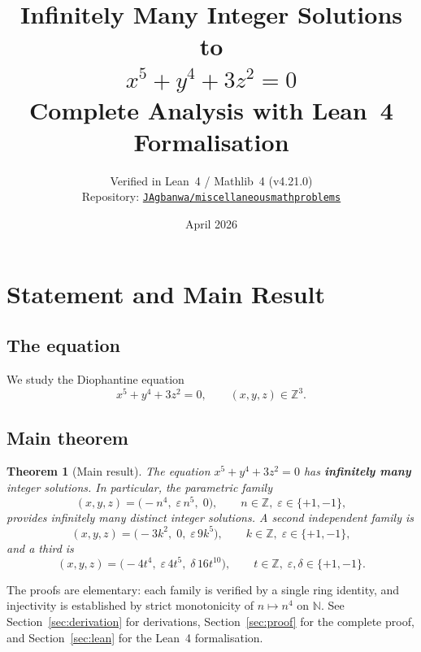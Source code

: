 \documentclass[12pt,a4paper]{article}
\title{%
  \Large\bfseries Infinitely Many Integer Solutions to\\[6pt]
  \Huge $x^5 + y^4 + 3z^2 = 0$\\[10pt]
  \large Complete Analysis with Lean~4 Formalisation
}
\author{%
  \normalsize Verified in Lean~4 / Mathlib~4 (v4.21.0)\\[2pt]
  \normalsize Repository: \href{https://github.com/JAgbanwa/miscellaneousmathproblems}%
    {\texttt{JAgbanwa/miscellaneousmathproblems}}
}
\date{\normalsize April 2026}
\newtheorem{theorem}{Theorem}[section]
\theoremstyle{definition}
\newcommand{\Z}{\mathbb{Z}}
\newcommand{\N}{\mathbb{N}}
\begin{document}
\maketitle
\tableofcontents
\newpage

\section{Statement and Main Result}\label{sec:intro}

\subsection{The equation}

We study the Diophantine equation
\begin{equation}\label{eq:main}
  x^5 + y^4 + 3z^2 = 0, \qquad (x,y,z)\in\Z^3. \tag{$\star$}
\end{equation}

\subsection{Main theorem}

\begin{theorem}[Main result]\label{thm:main}
  The equation $x^5 + y^4 + 3z^2 = 0$ has \textbf{infinitely many} integer solutions.
  In particular, the parametric family
  \begin{equation}\label{eq:family1}
    (x, y, z) = \bigl(-n^4,\; \varepsilon\, n^5,\; 0\bigr),
    \qquad n \in \Z,\; \varepsilon \in \{+1,-1\},
  \end{equation}
  provides infinitely many distinct integer solutions.  A second independent family is
  \begin{equation}\label{eq:family2}
    (x, y, z) = \bigl(-3k^2,\; 0,\; \varepsilon\, 9k^5\bigr),
    \qquad k \in \Z,\; \varepsilon \in \{+1,-1\},
  \end{equation}
  and a third is
  \begin{equation}\label{eq:family3}
    (x, y, z) = \bigl(-4t^4,\; \varepsilon\, 4t^5,\; \delta\, 16t^{10}\bigr),
    \qquad t \in \Z,\; \varepsilon,\delta \in \{+1,-1\}.
  \end{equation}
\end{theorem}

The proofs are elementary: each family is verified by a single ring identity,
and injectivity is established by strict monotonicity of $n \mapsto n^4$ on $\N$.
See Section~\ref{sec:derivation} for derivations,
Section~\ref{sec:proof} for the complete proof,
and Section~\ref{sec:lean} for the Lean~4 formalisation.
\end{document}
